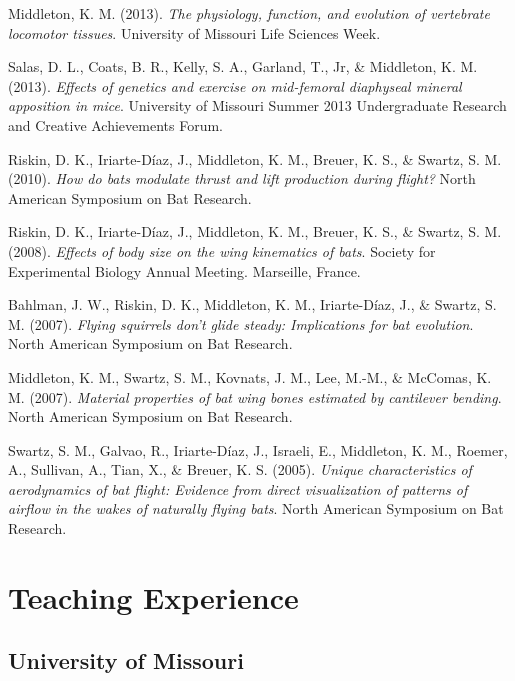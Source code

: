 \documentclass[11pt, a4paper]{awesome-cv}
\begin{document}
\leavevmode\hypertarget{ref-middleton_physiology_2013}{}%
Middleton, K. M. (2013). \emph{The physiology, function, and evolution
of vertebrate locomotor tissues}. University of Missouri Life Sciences
Week.

\leavevmode\hypertarget{ref-salas_effects_2013}{}%
Salas, D. L., Coats, B. R., Kelly, S. A., Garland, T., Jr, \& Middleton,
K. M. (2013). \emph{Effects of genetics and exercise on mid-femoral
diaphyseal mineral apposition in mice}. University of Missouri Summer
2013 Undergraduate Research and Creative Achievements Forum.

\leavevmode\hypertarget{ref-riskin_how_2010a}{}%
Riskin, D. K., Iriarte-Díaz, J., Middleton, K. M., Breuer, K. S., \&
Swartz, S. M. (2010). \emph{How do bats modulate thrust and lift
production during flight?} North American Symposium on Bat Research.

\leavevmode\hypertarget{ref-riskin_effects_2008}{}%
Riskin, D. K., Iriarte-Díaz, J., Middleton, K. M., Breuer, K. S., \&
Swartz, S. M. (2008). \emph{Effects of body size on the wing kinematics
of bats}. Society for Experimental Biology Annual Meeting. Marseille,
France.

\leavevmode\hypertarget{ref-bahlman_flying_2007}{}%
Bahlman, J. W., Riskin, D. K., Middleton, K. M., Iriarte-Díaz, J., \&
Swartz, S. M. (2007). \emph{Flying squirrels don't glide steady:
Implications for bat evolution}. North American Symposium on Bat
Research.

\leavevmode\hypertarget{ref-middleton_material_2007}{}%
Middleton, K. M., Swartz, S. M., Kovnats, J. M., Lee, M.-M., \& McComas,
K. M. (2007). \emph{Material properties of bat wing bones estimated by
cantilever bending}. North American Symposium on Bat Research.

\leavevmode\hypertarget{ref-swartz_unique_2005}{}%
Swartz, S. M., Galvao, R., Iriarte-Díaz, J., Israeli, E., Middleton, K.
M., Roemer, A., Sullivan, A., Tian, X., \& Breuer, K. S. (2005).
\emph{Unique characteristics of aerodynamics of bat flight: Evidence
from direct visualization of patterns of airflow in the wakes of
naturally flying bats}. North American Symposium on Bat Research.

\endgroup

\hypertarget{teaching-experience}{%
\section{Teaching Experience}\label{teaching-experience}}

\hypertarget{university-of-missouri}{%
\subsection{University of Missouri}\label{university-of-missouri}}
\end{document}
